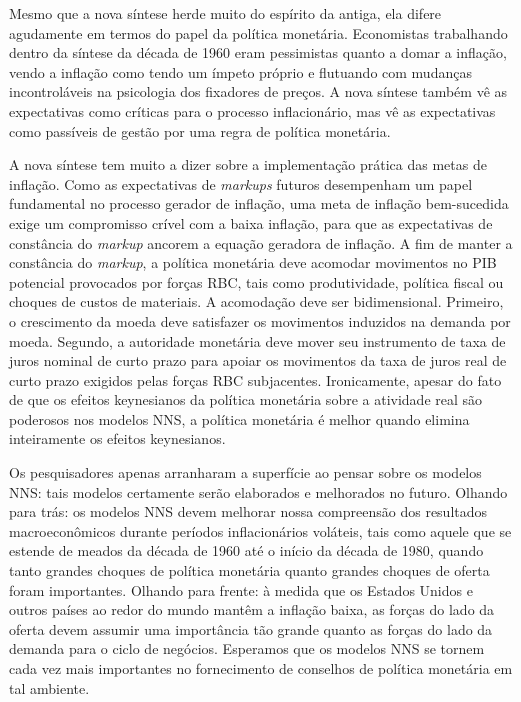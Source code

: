 \documentclass[12pt]{article}
\begin{document}
Mesmo que a nova síntese herde muito do espírito da antiga, ela difere agudamente em termos do papel da política monetária. Economistas trabalhando dentro da síntese da década de 1960 eram pessimistas quanto a domar a inflação, vendo a inflação como tendo um ímpeto próprio e flutuando com mudanças incontroláveis na psicologia dos fixadores de preços. A nova síntese também vê as expectativas como críticas para o processo inflacionário, mas vê as expectativas como passíveis de gestão por uma regra de política monetária.

A nova síntese tem muito a dizer sobre a implementação prática das metas de inflação. Como as expectativas de \textit{markups} futuros desempenham um papel fundamental no processo gerador de inflação, uma meta de inflação bem-sucedida exige um compromisso crível com a baixa inflação, para que as expectativas de constância do \textit{markup} ancorem a equação geradora de inflação. A fim de manter a constância do \textit{markup}, a política monetária deve acomodar movimentos no PIB potencial provocados por forças RBC, tais como produtividade, política fiscal ou choques de custos de materiais. A acomodação deve ser bidimensional. Primeiro, o crescimento da moeda deve satisfazer os movimentos induzidos na demanda por moeda. Segundo, a autoridade monetária deve mover seu instrumento de taxa de juros nominal de curto prazo para apoiar os movimentos da taxa de juros real de curto prazo exigidos pelas forças RBC subjacentes. Ironicamente, apesar do fato de que os efeitos keynesianos da política monetária sobre a atividade real são poderosos nos modelos NNS, a política monetária é melhor quando elimina inteiramente os efeitos keynesianos.

Os pesquisadores apenas arranharam a superfície ao pensar sobre os modelos NNS: tais modelos certamente serão elaborados e melhorados no futuro. Olhando para trás: os modelos NNS devem melhorar nossa compreensão dos resultados macroeconômicos durante períodos inflacionários voláteis, tais como aquele que se estende de meados da década de 1960 até o início da década de 1980, quando tanto grandes choques de política monetária quanto grandes choques de oferta foram importantes. Olhando para frente: à medida que os Estados Unidos e outros países ao redor do mundo mantêm a inflação baixa, as forças do lado da oferta devem assumir uma importância tão grande quanto as forças do lado da demanda para o ciclo de negócios. Esperamos que os modelos NNS se tornem cada vez mais importantes no fornecimento de conselhos de política monetária em tal ambiente.
\end{document}
